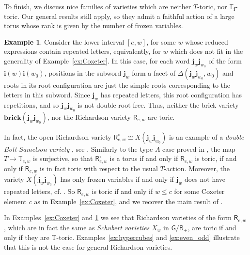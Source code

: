 \documentclass[a4paper, 11pt]{amsart}
\newcommand{\brick}{\mathbf{brick}}
\newcommand{\borel}{\mathsf{B}}
\newcommand{\orich}[1]{\mathsf{R}^{\circ}_{#1}}
\newcommand{\rich}[1]{\mathsf{R}_{#1}}
\newcommand{\word}[1]{\mathbf{#1}}
\newcommand{\group}{\mathsf{G}}
\newcommand{\dil}[1]{\mathbb{T}_{#1}}
\theoremstyle{definition}
\newtheorem{example}[theorem]{Example}
\begin{document}
To finish, we discuss nice families of varieties which are neither $T$-toric, nor $\dil{\word{i}}$-toric. Our general results still apply, so they admit a faithful action of a large torus whose rank is given by the number of frozen variables.

\begin{example}
\label{ex:schubert_not_coxeter}
Consider the lower interval $[e, w]$, for some $w$ whose reduced expressions contain repeated letters, equivalently, for $w$ which does not fit in the generality of Example~\ref{ex:Coxeter}. In this case, for each word $\word{j}_w \word{j}_{w_0}$ of the form $\word{i}(w)\word{i}(w_0)$, positions in the subword $\word{j}_w$ form a facet of $\Delta(\word{j}_w \word{j}_{w_0}, w_0)$ and roots in its root configuration are just the simple roots corresponding to the letters in this subword.  Since $\word{j}_w$ has repeated letters, this root configuration has repetitions, and so $\word{j}_w \word{j}_{w_0}$ is not double root free. Thus, neither the brick variety $\brick(\word{j}_w \word{j}_{w_0})$, nor the Richardson variety $\rich{e,w}$ are toric.

In fact, the open Richardson variety $\orich{e,w} \cong X(\word{j}_{w}\word{j}_{w_0})$ is an example of a \emph{double Bott-Samelson variety} \cite{SW}, see \cite[Lemma 3.16]{CGGLSS}. Similarly to the type $A$ case proved in \cite[Lemma 4.41]{CGSS}, the map $T \to \dil{e,w}$ is surjective, so that $\orich{e,w}$ is a torus if and only if $\rich{e,w}$ is toric, if and only if $\rich{e,w}$ is in fact toric with respect to the usual $T$-action. Moreover, the variety $X(\word{j}_w\word{j}_{w_0})$ has only frozen variables if and only if $\word{j}_w$ does not have repeated letters, cf. \cite[Proposition 4.44]{CGGLSS}. So $\rich{e,w}$ is toric if and only if $w \leq c$ for some Coxeter element $c$ as in Example~\ref{ex:Coxeter}, and we recover the main result of \cite{Karuppuchamy}.  
\end{example}

In Examples~\ref{ex:Coxeter} and \ref{ex:schubert_not_coxeter} we see that Richardson varieties of the form $\rich{e,w}$, which are in fact the same as \emph{Schubert varieties} $X_w$ in $\group/\borel_+$, are toric if and only if they are T-toric.
Examples~\ref{ex:hypercubes} and \ref{ex:even_odd} illustrate that this is not the case for general Richardson varieties.
\end{document}
